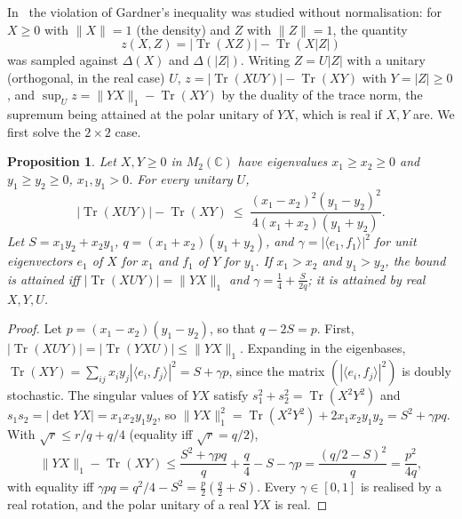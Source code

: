 \documentclass[11pt]{article}
\DeclareMathOperator{\Tr}{Tr}
\newcommand{\C}{\mathbb{C}}
\theoremstyle{plain}
\newtheorem{proposition}[theorem]{Proposition}
\theoremstyle{definition}
\theoremstyle{remark}
\begin{document}
In~\cite[Sect.~5]{abed2024} the violation of Gardner's inequality was studied without normalisation: for $X\ge0$ with
$\|X\|=1$ (the density) and $Z$ with $\|Z\|=1$, the quantity
\[
  z(X,Z)=|\Tr(XZ)|-\Tr(X|Z|)
\]
was sampled against $\Delta(X)$ and $\Delta(|Z|)$. Writing $Z=U|Z|$ with a unitary (orthogonal, in the real case) $U$,
$z=|\Tr(XUY)|-\Tr(XY)$ with $Y=|Z|\ge0$, and $\sup_Uz=\|YX\|_1-\Tr(XY)$ by the duality of the trace norm, the supremum being
attained at the polar unitary of $YX$, which is real if $X,Y$ are. We first solve the $2\times2$ case.

\begin{proposition}\label{prop:k2}
Let $X,Y\ge0$ in $M_2(\C)$ have eigenvalues $x_1\ge x_2\ge0$ and $y_1\ge y_2\ge0$, $x_1,y_1>0$. For every unitary $U$,
\[
  |\Tr(XUY)|-\Tr(XY)\ \le\ \frac{(x_1-x_2)^2(y_1-y_2)^2}{4(x_1+x_2)(y_1+y_2)} .
\]
Let $S=x_1y_2+x_2y_1$, $q=(x_1+x_2)(y_1+y_2)$, and $\gamma=|\langle e_1,f_1\rangle|^2$ for unit eigenvectors $e_1$ of $X$ for
$x_1$ and $f_1$ of $Y$ for $y_1$. If $x_1>x_2$ and $y_1>y_2$, the bound is attained iff $|\Tr(XUY)|=\|YX\|_1$ and
$\gamma=\frac14+\frac S{2q}$; it is attained by real $X,Y,U$.
\end{proposition}
\begin{proof}
Let $p=(x_1-x_2)(y_1-y_2)$, so that $q-2S=p$. First, $|\Tr(XUY)|=|\Tr(YXU)|\le\|YX\|_1$. Expanding in the eigenbases,
$\Tr(XY)=\sum_{ij}x_iy_j|\langle e_i,f_j\rangle|^2=S+\gamma p$, since the matrix $(|\langle e_i,f_j\rangle|^2)$ is doubly
stochastic. The singular values of $YX$ satisfy $s_1^2+s_2^2=\Tr(X^2Y^2)$ and $s_1s_2=|\det YX|=x_1x_2y_1y_2$, so
$\|YX\|_1^2=\Tr(X^2Y^2)+2x_1x_2y_1y_2=S^2+\gamma pq$. With $\sqrt r\le r/q+q/4$ (equality iff $\sqrt r=q/2$),
\[
  \|YX\|_1-\Tr(XY)\le\frac{S^2+\gamma pq}q+\frac q4-S-\gamma p=\frac{(q/2-S)^2}q=\frac{p^2}{4q},
\]
with equality iff $\gamma pq=q^2/4-S^2=\frac p2(\frac q2+S)$. Every $\gamma\in[0,1]$ is realised by a real rotation, and the
polar unitary of a real $YX$ is real.
\end{proof}
\end{document}
